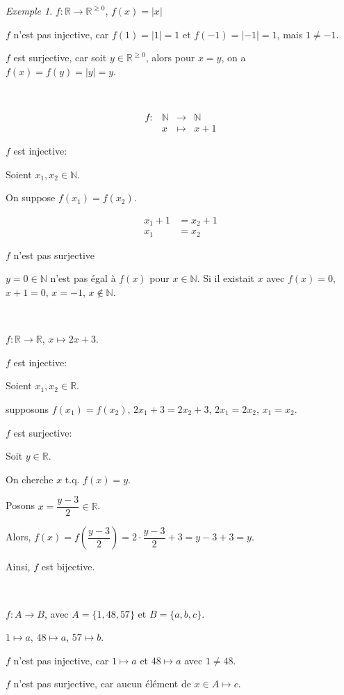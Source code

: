 \documentclass{report}
\newcommand*{\abs}[1]{\left| #1 \right|}
\theoremstyle{definition}
\theoremstyle{remark}
\newtheorem*{exem}{Exemple}
\begin{document}
	\begin{exem}
		$f:\mathbb{R} \to \mathbb{R}^{\geq0}$, $f(x)=\abs{x}$

		$f$ n'est pas injective, car $f(1)=\abs{1}=1$ et $f(-1)=\abs{-1}=1$, mais $1 \neq -1$.

		$f$ est surjective, car soit $y \in \mathbb{R}^{\geq0}$, alors pour $x=y$, on a $f(x)=f(y)=\abs{y}=y$.

		~

		\[
		\begin{array}{rrcl}
			f:&\mathbb{N}&\to&\mathbb{N}\\
			&x&\mapsto&x+1
		\end{array}
		\]

		$f$ est injective:

		Soient $x_1,x_2 \in \mathbb{N}$.

		On suppose $f(x_1)=f(x_2)$.

		\begin{align*}
			x_1+1&= x_2+1\\
			x_1&= x_2
		\end{align*}

		$f$ n'est pas surjective

		$y=0\in\mathbb{N}$ n'est pas \'egal \`a $f(x)$ pour $x\in\mathbb{N}$. Si il existait $x$ avec $f(x)=0$, $x+1=0$, $x=-1$, $x \not\in \mathbb{N}$.

		~

		$f:\mathbb{R}\to\mathbb{R}$, $x \mapsto 2x+3$.

		$f$ est injective:

		Soient $x_1,x_2 \in \mathbb{R}$.

		supposons $f(x_1)=f(x_2)$, $2x_1+3=2x_2+3$, $2x_1=2x_2$, $x_1=x_2$.

		$f$ est surjective:

		Soit $y \in \mathbb{R}$.

		On cherche $x$ t.q. $f(x)=y$.

		Posons $x=\dfrac{y-3}{2} \in \mathbb{R}$.

		Alors, $f(x) = f\left( \dfrac{y-3}{2} \right) = 2 \cdot  \dfrac{y-3}{2} + 3 = y-3+3 = y$.

		Ainsi, $f$ est bijective.

		~

		$f:A \to B$, avec $A=\{1,48,57\}$ et $B=\{a,b,c\}$.

		$1 \mapsto a$, $48 \mapsto a$, $57 \mapsto b$.

		$f$ n'est pas injective, car $1 \mapsto a$ et $48 \mapsto a$  avec $1 \neq 48$.

		$f$ n'est pas surjective, car aucun \'el\'ement de $x \in A \mapsto c$.
	\end{exem}
\end{document}
